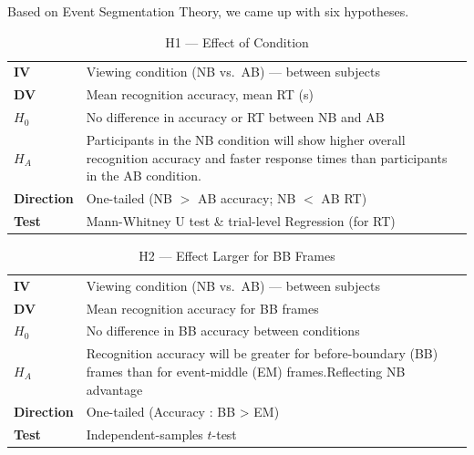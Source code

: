 \documentclass[11pt]{article}
\begin{document}
Based on Event Segmentation Theory, we came up with six hypotheses.

\medskip

\begin{table}[H]
\centering\small
\caption*{H1 \;—\; Effect of Condition}
\begin{tabularx}{\textwidth}{@{} l X @{}}
\toprule
\textbf{IV}        & Viewing condition (NB vs.\ AB) --- between subjects \\
\textbf{DV}        & Mean recognition accuracy, mean RT (s) \\
$H_0$              & No difference in accuracy or RT between NB and AB \\
$H_A$              & Participants in the NB condition will show higher overall recognition accuracy and faster response times than participants in the AB condition.\\
\textbf{Direction} & One-tailed \;(NB $>$ AB accuracy;\; NB $<$ AB RT) \\
\textbf{Test}      & Mann-Whitney U test \& trial-level Regression (for RT) \\
\bottomrule
\end{tabularx}
\end{table}

\begin{table}[H]
\centering\small
\caption*{H2 \;—\; Effect Larger for BB Frames}
\begin{tabularx}{\textwidth}{@{} l X @{}}
\toprule
\textbf{IV}        & Viewing condition (NB vs.\ AB) --- between subjects \\
\textbf{DV}        & Mean recognition accuracy for BB frames \\
$H_0$              & No difference in BB accuracy between conditions \\
$H_A$              & Recognition accuracy will be greater for before-boundary (BB) frames than for event-middle (EM) frames.Reflecting NB advantage\\
\textbf{Direction} & One-tailed \;(Accuracy : BB > EM) \\
\textbf{Test}      & Independent-samples $t$-test \\
\bottomrule
\end{tabularx}
\end{table}
\end{document}
